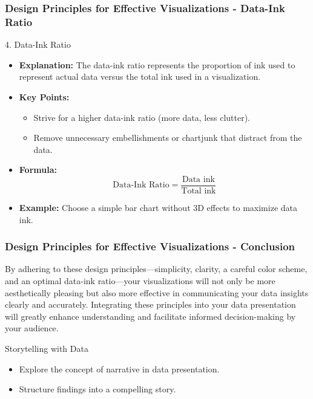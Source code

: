 \documentclass[aspectratio=169]{beamer}
\begin{document}
\begin{frame}[fragile]
    \frametitle{Design Principles for Effective Visualizations - Data-Ink Ratio}
    \begin{block}{4. Data-Ink Ratio}
        \begin{itemize}
            \item \textbf{Explanation:} The data-ink ratio represents the proportion of ink used to represent actual data versus the total ink used in a visualization.
            \item \textbf{Key Points:}
                \begin{itemize}
                    \item Strive for a higher data-ink ratio (more data, less clutter).
                    \item Remove unnecessary embellishments or chartjunk that distract from the data.
                \end{itemize}
            \item \textbf{Formula:}
            \begin{equation}
                \text{Data-Ink Ratio} = \frac{\text{Data ink}}{\text{Total ink}}
            \end{equation}
            \item \textbf{Example:} Choose a simple bar chart without 3D effects to maximize data ink.
        \end{itemize}
    \end{block}
\end{frame}

\begin{frame}[fragile]
    \frametitle{Design Principles for Effective Visualizations - Conclusion}
    By adhering to these design principles—simplicity, clarity, a careful color scheme, and an optimal data-ink ratio—your visualizations will not only be more aesthetically pleasing but also more effective in communicating your data insights clearly and accurately. Integrating these principles into your data presentation will greatly enhance understanding and facilitate informed decision-making by your audience.
\end{frame}

\begin{frame}[fragile]{Storytelling with Data}
    \begin{itemize}
        \item Explore the concept of narrative in data presentation.
        \item Structure findings into a compelling story.
    \end{itemize}
\end{frame}
\end{document}
